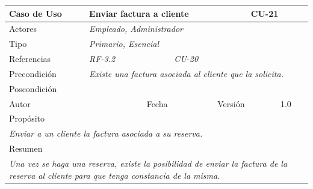\begin{table}[H]
    \begin{tabular}{|llllllll|}
    \hline
    \multicolumn{1}{|l|}{Caso de Uso}       & \multicolumn{5}{l|}{Enviar factura a cliente}                                                                          & \multicolumn{2}{l|}{\cellcolor[HTML]{E6E6E6}CU-21}          \\ \hline
    \multicolumn{1}{|l|}{Actores}           & \multicolumn{7}{l|}{{\color[HTML]{808080} \textit{Empleado, Administrador}}}                                                                                                                           \\ \hline
    \multicolumn{1}{|l|}{Tipo}              & \multicolumn{7}{l|}{{\color[HTML]{808080} \textit{Primario, Esencial}}}                                                                                                                \\ \hline
    \multicolumn{1}{|l|}{Referencias}       & \multicolumn{2}{l|}{{\color[HTML]{808080} \textit{RF-3.2}}}              & \multicolumn{5}{l|}{{\color[HTML]{808080} \textit{CU-20}}}                                                                                       \\ \hline
    \multicolumn{1}{|l|}{Precondición}      & \multicolumn{7}{l|}{{\color[HTML]{808080} \textit{Existe una factura asociada al cliente que la solicita.}}}                                                                                                \\ \hline
    \multicolumn{1}{|l|}{Poscondición}      & \multicolumn{7}{l|}{}                                                                                                                                                                  \\ \hline
    \multicolumn{1}{|l|}{Autor}             & \multicolumn{1}{l|}{}                        & \multicolumn{2}{l|}{Fecha}           & \multicolumn{1}{l|}{}     & \multicolumn{2}{l|}{Versión}         & 1.0                           \\ \hline
    \multicolumn{8}{|l|}{\cellcolor[HTML]{F2F2F2}Propósito}                                                                                                                                                                          \\ \hline
    \multicolumn{8}{|p{15cm}|}{{\color[HTML]{808080} \textit{Enviar a un cliente la factura asociada a su reserva.}}}                                                                                                           \\ \hline
    \multicolumn{8}{|l|}{\cellcolor[HTML]{F2F2F2}Resumen}                                                                                                                                                                            \\ \hline
    \multicolumn{8}{|p{15cm}|}{{\color[HTML]{808080} \textit{Una vez se haga una reserva, existe la posibilidad de enviar la factura de la reserva al cliente para que tenga constancia de la misma.}}} \\ \hline
    \end{tabular}
\end{table}

